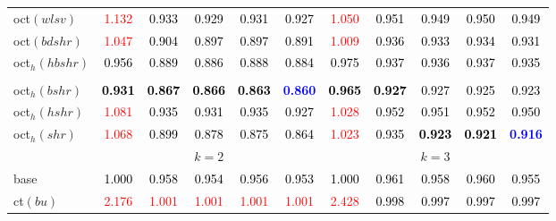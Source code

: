 \begin{tabular}[t]{l|>{}cccc>{}c|ccccc}
oct$(wlsv)$ & \textcolor{red}{1.132} & \textcolor{black}{0.933} & \textcolor{black}{0.929} & \textcolor{black}{0.931} & \textcolor{black}{0.927} & \textcolor{red}{1.050} & \textcolor{black}{0.951} & \textcolor{black}{0.949} & \textcolor{black}{0.950} & \textcolor{black}{0.949}\\
oct$(bdshr)$ & \textcolor{red}{1.047} & \textcolor{black}{0.904} & \textcolor{black}{0.897} & \textcolor{black}{0.897} & \textcolor{black}{0.891} & \textcolor{red}{1.009} & \textcolor{black}{0.936} & \textcolor{black}{0.933} & \textcolor{black}{0.934} & \textcolor{black}{0.931}\\
oct$_h(hbshr)$ & \textcolor{black}{0.956} & \textcolor{black}{0.889} & \textcolor{black}{0.886} & \textcolor{black}{0.888} & \textcolor{black}{0.884} & \textcolor{black}{0.975} & \textcolor{black}{0.937} & \textcolor{black}{0.936} & \textcolor{black}{0.937} & \textcolor{black}{0.935}\\[-1.5ex]
\hline\\[-1.5ex]
oct$_h(bshr)$ & \textcolor{black}{\textbf{0.931}} & \textcolor{black}{\textbf{0.867}} & \textcolor{black}{\textbf{0.866}} & \textcolor{black}{\textbf{0.863}} & \textcolor{blue}{\textbf{0.860}} & \textcolor{black}{\textbf{0.965}} & \textcolor{black}{\textbf{0.927}} & \textcolor{black}{0.927} & \textcolor{black}{0.925} & \textcolor{black}{0.923}\\
oct$_h(hshr)$ & \textcolor{red}{1.081} & \textcolor{black}{0.935} & \textcolor{black}{0.931} & \textcolor{black}{0.935} & \textcolor{black}{0.927} & \textcolor{red}{1.028} & \textcolor{black}{0.952} & \textcolor{black}{0.951} & \textcolor{black}{0.952} & \textcolor{black}{0.950}\\
oct$_h(shr)$ & \textcolor{red}{1.068} & \textcolor{black}{0.899} & \textcolor{black}{0.878} & \textcolor{black}{0.875} & \textcolor{black}{0.864} & \textcolor{red}{1.023} & \textcolor{black}{0.935} & \textcolor{black}{\textbf{0.923}} & \textcolor{black}{\textbf{0.921}} & \textcolor{blue}{\textbf{0.916}}\\
\addlinespace[0.3em]
\multicolumn{1}{c}{} & \multicolumn{5}{c}{\textbf{$k = 2$}} & \multicolumn{5}{c}{\textbf{$k = 3$}}\\
base & \textcolor{black}{1.000} & \textcolor{black}{0.958} & \textcolor{black}{0.954} & \textcolor{black}{0.956} & \textcolor{black}{0.953} & \textcolor{black}{1.000} & \textcolor{black}{0.961} & \textcolor{black}{0.958} & \textcolor{black}{0.960} & \textcolor{black}{0.955}\\
ct$(bu)$ & \textcolor{red}{2.176} & \textcolor{red}{1.001} & \textcolor{red}{1.001} & \textcolor{red}{1.001} & \textcolor{red}{1.001} & \textcolor{red}{2.428} & \textcolor{black}{0.998} & \textcolor{black}{0.997} & \textcolor{black}{0.997} & \textcolor{black}{0.997}\\

\end{tabular}
